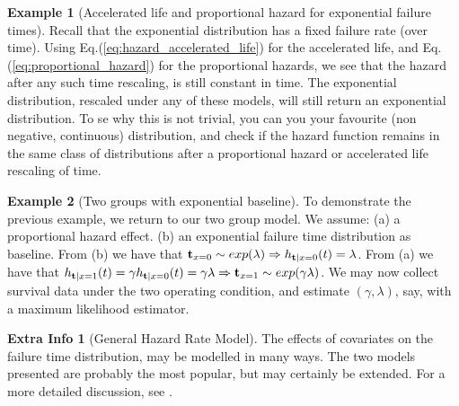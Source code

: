\documentclass[12pt,a4paper]{report}
\theoremstyle{plain}
\theoremstyle{definition}
\newtheorem{extra}{Extra Info}
\newtheorem{example}{Example}
\begin{document}
\begin{example}[Accelerated life and proportional hazard for exponential failure times]
Recall that the exponential distribution has a fixed failure rate (over time). 
Using Eq.(\ref{eq:hazard_accelerated_life}) for the accelerated life, and Eq.(\ref{eq:proportional_hazard}) for the proportional hazards, we see that the hazard after any such time rescaling, is still constant in time. 
The exponential distribution, rescaled under any of these models, will still return an exponential distribution.
To se why this is not trivial, you can you your favourite (non negative, continuous) distribution, and check if the hazard function remains in the same class of distributions after a proportional hazard or accelerated life rescaling of time.
\end{example}


\begin{example}[Two groups with exponential baseline]
To demonstrate the previous example, we return to our two group model.
We assume: 
(a) a proportional hazard effect.
(b) an exponential failure time distribution as baseline.
From (b) we have that $\mathbf{t}_{x=0}\sim exp(\lambda) \Rightarrow h_{\mathbf{t}|x=0} (t)=\lambda$. 
From (a) we have that $h_{\mathbf{t}|x=1} (t)=\gamma h_{\mathbf{t}|x=0} (t)= \gamma \lambda \Rightarrow \mathbf{t}_{x=1}\sim exp(\gamma \lambda) $.
We may now collect survival data under the two operating condition, and estimate $(\gamma, \lambda)$, say, with a maximum likelihood estimator. 
\end{example}






\begin{extra}[General Hazard Rate Model]
The effects of covariates on the failure time distribution, may be modelled in many ways. 
The two models presented are probably the most popular, but may certainly be extended. 
For a more detailed discussion, see \cite{cox_analysis_1984}.
\end{extra}
\end{document}
